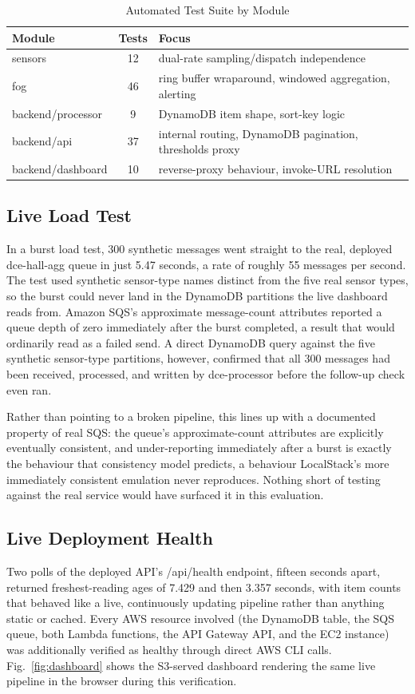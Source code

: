 \documentclass[conference]{IEEEtran}
\begin{document}
\begin{table}[!t]
\caption{Automated Test Suite by Module}
\label{tab:tests}
\centering
\footnotesize
\begin{tabular}{@{}lcp{}@{}}
\hline
\textbf{Module} & \textbf{Tests} & \textbf{Focus} \\
\hline
sensors & 12 & dual-rate sampling/dispatch independence \\
fog & 46 & ring buffer wraparound, windowed aggregation, alerting \\
backend/processor & 9 & DynamoDB item shape, sort-key logic \\
backend/api & 37 & internal routing, DynamoDB pagination, thresholds proxy \\
backend/dashboard & 10 & reverse-proxy behaviour, invoke-URL resolution \\
\hline
\end{tabular}
\end{table}

\subsection{Live Load Test}
In a burst load test, 300 synthetic messages went straight to the real, deployed dce-hall-agg queue in just 5.47 seconds, a rate of roughly 55 messages per second. The test used synthetic sensor-type names distinct from the five real sensor types, so the burst could never land in the DynamoDB partitions the live dashboard reads from. Amazon SQS's approximate message-count attributes reported a queue depth of zero immediately after the burst completed, a result that would ordinarily read as a failed send. A direct DynamoDB query against the five synthetic sensor-type partitions, however, confirmed that all 300 messages had been received, processed, and written by dce-processor before the follow-up check even ran.

Rather than pointing to a broken pipeline, this lines up with a documented property of real SQS: the queue's approximate-count attributes are explicitly eventually consistent, and under-reporting immediately after a burst is exactly the behaviour that consistency model predicts, a behaviour LocalStack's more immediately consistent emulation never reproduces. Nothing short of testing against the real service would have surfaced it in this evaluation.

\subsection{Live Deployment Health}
Two polls of the deployed API's /api/health endpoint, fifteen seconds apart, returned freshest-reading ages of 7.429 and then 3.357 seconds, with item counts that behaved like a live, continuously updating pipeline rather than anything static or cached. Every AWS resource involved (the DynamoDB table, the SQS queue, both Lambda functions, the API Gateway API, and the EC2 instance) was additionally verified as healthy through direct AWS CLI calls. Fig.~\ref{fig:dashboard} shows the S3-served dashboard rendering the same live pipeline in the browser during this verification.
\end{document}
